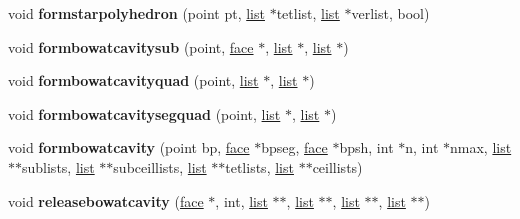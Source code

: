 \begin{DoxyCompactItemize}
\item 
\hypertarget{classtetgenmesh_a7a07201bc551ba8357b2940225632ba7}{void {\bfseries formstarpolyhedron} (point pt, \hyperlink{classtetgenmesh_1_1list}{list} $\ast$tetlist, \hyperlink{classtetgenmesh_1_1list}{list} $\ast$verlist, bool)}\label{classtetgenmesh_a7a07201bc551ba8357b2940225632ba7}

\item 
\hypertarget{classtetgenmesh_ae34f53f952a7aee32bf0a1d891124ac5}{void {\bfseries formbowatcavitysub} (point, \hyperlink{classtetgenmesh_1_1face}{face} $\ast$, \hyperlink{classtetgenmesh_1_1list}{list} $\ast$, \hyperlink{classtetgenmesh_1_1list}{list} $\ast$)}\label{classtetgenmesh_ae34f53f952a7aee32bf0a1d891124ac5}

\item 
\hypertarget{classtetgenmesh_a1546f60f1739b46a24f163a75be972f3}{void {\bfseries formbowatcavityquad} (point, \hyperlink{classtetgenmesh_1_1list}{list} $\ast$, \hyperlink{classtetgenmesh_1_1list}{list} $\ast$)}\label{classtetgenmesh_a1546f60f1739b46a24f163a75be972f3}

\item 
\hypertarget{classtetgenmesh_a4d11f24b4c8d391f1678662fe6278460}{void {\bfseries formbowatcavitysegquad} (point, \hyperlink{classtetgenmesh_1_1list}{list} $\ast$, \hyperlink{classtetgenmesh_1_1list}{list} $\ast$)}\label{classtetgenmesh_a4d11f24b4c8d391f1678662fe6278460}

\item 
\hypertarget{classtetgenmesh_a9e3cd25bc22d263609f673faaf149e90}{void {\bfseries formbowatcavity} (point bp, \hyperlink{classtetgenmesh_1_1face}{face} $\ast$bpseg, \hyperlink{classtetgenmesh_1_1face}{face} $\ast$bpsh, int $\ast$n, int $\ast$nmax, \hyperlink{classtetgenmesh_1_1list}{list} $\ast$$\ast$sublists, \hyperlink{classtetgenmesh_1_1list}{list} $\ast$$\ast$subceillists, \hyperlink{classtetgenmesh_1_1list}{list} $\ast$$\ast$tetlists, \hyperlink{classtetgenmesh_1_1list}{list} $\ast$$\ast$ceillists)}\label{classtetgenmesh_a9e3cd25bc22d263609f673faaf149e90}

\item 
\hypertarget{classtetgenmesh_a9e5627db83f59890de46d8e515458be5}{void {\bfseries releasebowatcavity} (\hyperlink{classtetgenmesh_1_1face}{face} $\ast$, int, \hyperlink{classtetgenmesh_1_1list}{list} $\ast$$\ast$, \hyperlink{classtetgenmesh_1_1list}{list} $\ast$$\ast$, \hyperlink{classtetgenmesh_1_1list}{list} $\ast$$\ast$, \hyperlink{classtetgenmesh_1_1list}{list} $\ast$$\ast$)}\label{classtetgenmesh_a9e5627db83f59890de46d8e515458be5}


\end{DoxyCompactItemize}
